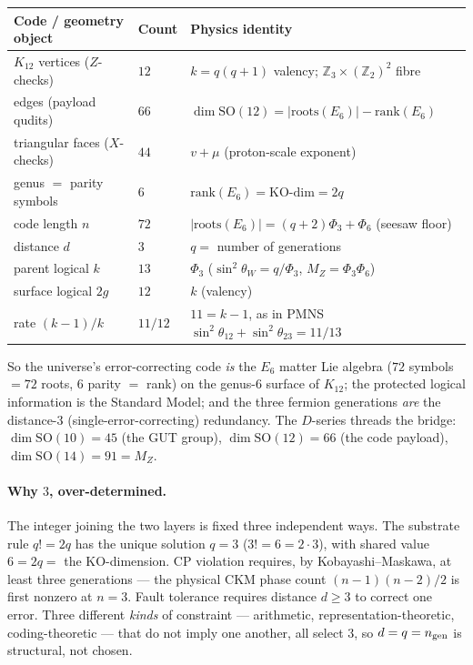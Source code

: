 \documentclass[11pt]{article}
\begin{document}
\begin{center}\small
\begin{tabular}{l l l}
\toprule
Code / geometry object & Count & Physics identity\\ \midrule
$K_{12}$ vertices ($Z$-checks) & $12$ & $k=q(q{+}1)$ valency; $\mathbb{Z}_3{\times}(\mathbb{Z}_2)^2$ fibre\\
edges (payload qudits) & $66$ & $\dim\mathrm{SO}(12)=|\mathrm{roots}(E_6)|-\mathrm{rank}(E_6)$\\
triangular faces ($X$-checks) & $44$ & $v+\mu$ (proton-scale exponent)\\
genus $=$ parity symbols & $6$ & $\mathrm{rank}(E_6)=\text{KO-dim}=2q$\\
code length $n$ & $72$ & $|\mathrm{roots}(E_6)|=(q{+}2)\Phi_3+\Phi_6$ (seesaw floor)\\
distance $d$ & $3$ & $q=$ number of generations\\
parent logical $k$ & $13$ & $\Phi_3$ ($\sin^2\theta_W=q/\Phi_3$, $M_Z=\Phi_3\Phi_6$)\\
surface logical $2g$ & $12$ & $k$ (valency)\\
rate $(k{-}1)/k$ & $11/12$ & $11=k{-}1$, as in PMNS $\sin^2\theta_{12}{+}\sin^2\theta_{23}=11/13$\\
\bottomrule
\end{tabular}
\end{center}

\noindent So the universe's error-correcting code \emph{is} the $E_6$ matter Lie algebra ($72$
symbols $=72$ roots, $6$ parity $=$ rank) on the genus-$6$ surface of $K_{12}$; the protected
logical information is the Standard Model; and the three fermion generations \emph{are} the
distance-$3$ (single-error-correcting) redundancy. The $D$-series threads the bridge:
$\dim\mathrm{SO}(10)=45$ (the GUT group), $\dim\mathrm{SO}(12)=66$ (the code payload),
$\dim\mathrm{SO}(14)=91=M_Z$.

\paragraph{Why $3$, over-determined.} The integer joining the two layers is fixed three
independent ways. The substrate rule $q!=2q$ has the unique solution $q=3$ ($3!=6=2\cdot3$), with
shared value $6=2q=$ the KO-dimension. CP violation requires, by Kobayashi--Maskawa, at least
three generations --- the physical CKM phase count $(n{-}1)(n{-}2)/2$ is first nonzero at $n=3$.
Fault tolerance requires distance $d\ge3$ to correct one error. Three different \emph{kinds} of
constraint --- arithmetic, representation-theoretic, coding-theoretic --- that do not imply one
another, all select $3$, so $d=q=n_{\rm gen}$ is structural, not chosen.
\end{document}
